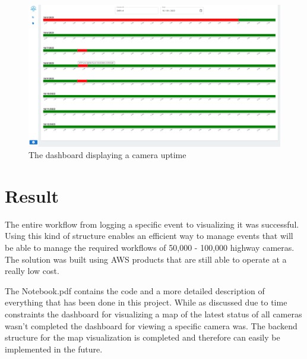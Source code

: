 \documentclass[12pt]{article}
\begin{document}
\begin{figure}[!h]
    \centering
    \includegraphics[width=1\linewidth]{dashboard.jpg}
    \caption{The dashboard displaying a camera uptime}
    \label{fig:enter-label}
\end{figure}

\section{Result}
The entire workflow from logging a specific event to visualizing it was successful. Using this kind of structure enables an efficient way to manage events that will be able to manage the required workflows of 50,000 - 100,000 highway cameras. The solution was built using AWS products that are still able to operate at a really low cost.

The Notebook.pdf contains the code and a more detailed description of everything that has been done in this project. While as discussed due to time constraints the dashboard for visualizing a map of the latest status of all cameras wasn't completed the dashboard for viewing a specific camera was. The backend structure for the map visualization is completed and therefore can easily be implemented in the future.

\printbibliography
\end{document}
